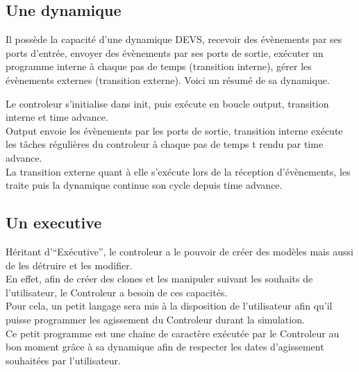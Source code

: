 \subsection{Une dynamique}
Il possède la capacité d'une dynamique DEVS, recevoir des évènements par ses ports d'entrée, envoyer des évènements par ses ports de sortie, exécuter un programme interne à chaque pas de temps (transition interne), gérer les évènements externes (transition externe). Voici un résumé de sa dynamique. \\
\noindent\begin{minipage}{\linewidth}%
\end{minipage}

Le controleur s'initialise dans init, puis exécute en boucle output, transition interne et time advance. \\
Output envoie les évènements par les ports de sortie, transition interne exécute les tâches régulières du controleur à chaque pas de temps t rendu par time advance.\\
La transition externe quant à elle s'exécute lors de la réception d'évènements, les traite puis la dynamique continue son cycle depuis time advance.

\subsection{Un executive}
Héritant d'``Exécutive'', le controleur a le pouvoir de créer des modèles mais aussi de les détruire et les modifier.\\
En effet, afin de créer des clones et les manipuler suivant les souhaits de l'utilisateur, le Controleur a besoin de ces capacités.\\
Pour cela, un petit langage sera mis à la disposition de l'utilisateur afin qu'il puisse programmer les agissement du Controleur durant la simulation. \\
Ce petit programme est une chaine de caractère exécutée par le Controleur au bon moment grâce à sa dynamique afin de respecter les dates d'agissement souhaitées par l'utilisateur.

